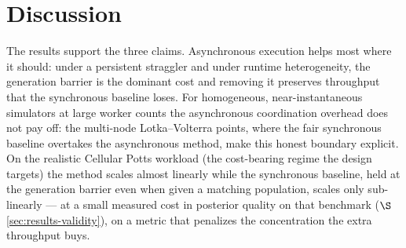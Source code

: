 \section{Discussion}\label{sec:discussion}
The results support the three claims. Asynchronous execution helps most where it should: under a persistent straggler and under runtime heterogeneity, the generation barrier is the dominant cost and removing it preserves throughput that the synchronous baseline loses. For homogeneous, near-instantaneous simulators at large worker counts the asynchronous coordination overhead does not pay off: the multi-node Lotka--Volterra points, where the fair synchronous baseline overtakes the asynchronous method, make this honest boundary explicit. On the realistic Cellular Potts workload (the cost-bearing regime the design targets) the method scales almost linearly while the synchronous baseline, held at the generation barrier even when given a matching population, scales only sub-linearly --- at a small measured cost in posterior quality on that benchmark ($\S$\ref{sec:results-validity}), on a metric that penalizes the concentration the extra throughput buys.

